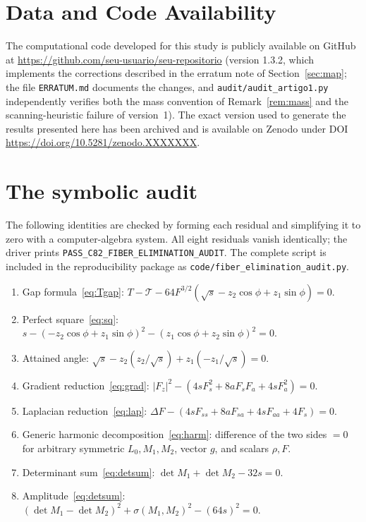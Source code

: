 \documentclass[11pt,reqno]{amsart}
\theoremstyle{plain}
\theoremstyle{definition}
\newcommand{\calT}{\mathcal{T}}
\newcommand{\Fz}{F_{z}}
\begin{document}
\section*{Data and Code Availability}

The computational code developed for this study is publicly available on GitHub at \url{https://github.com/seu-usuario/seu-repositorio} (version 1.3.2, which implements the corrections described in the erratum note of Section~\ref{sec:map}; the file \texttt{ERRATUM.md} documents the changes, and \texttt{audit/audit\_artigo1.py} independently verifies both the mass convention of Remark~\ref{rem:mass} and the scanning-heuristic failure of version~1). The exact version used to generate the results presented here has been archived and is available on Zenodo under DOI \url{https://doi.org/10.5281/zenodo.XXXXXXX}.

\appendix

\section{The symbolic audit}\label{app:audit}

The following identities are checked by forming each residual and simplifying it to zero with a computer-algebra system. All eight residuals vanish identically; the driver prints \texttt{PASS\_C82\_FIBER\_ELIMINATION\_AUDIT}. The complete script is included in the reproducibility package as \texttt{code/fiber\_elimination\_audit.py}.

\begin{enumerate}
\item[R1] Gap formula~\eqref{eq:Tgap}: $T-\calT-64F^{3/2}(\sqrt s-z_2\cos\phi+z_1\sin\phi)=0$.
\item[R2] Perfect square~\eqref{eq:sq}: $s-(-z_2\cos\phi+z_1\sin\phi)^2-(z_1\cos\phi+z_2\sin\phi)^2=0$.
\item[R3] Attained angle: $\sqrt s-z_2(z_2/\sqrt s)+z_1(-z_1/\sqrt s)=0$.
\item[R4] Gradient reduction~\eqref{eq:grad}: $|\Fz|^2-(4sF_s^2+8aF_sF_a+4sF_a^2)=0$.
\item[R5] Laplacian reduction~\eqref{eq:lap}: $\Delta F-(4sF_{ss}+8aF_{sa}+4sF_{aa}+4F_s)=0$.
\item[R6] Generic harmonic decomposition~\eqref{eq:harm}: difference of the two sides $=0$ for arbitrary symmetric $L_0,M_1,M_2$, vector $g$, and scalars $\rho,F$.
\item[R7] Determinant sum~\eqref{eq:detsum}: $\det M_1+\det M_2-32s=0$.
\item[R8] Amplitude~\eqref{eq:detsum}: $(\det M_1-\det M_2)^2+\sigma(M_1,M_2)^2-(64s)^2=0$.
\end{enumerate}
\end{document}
